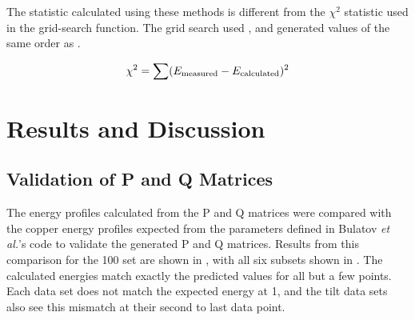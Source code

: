 \documentclass[twoside,senior]{BYUPhys}
\begin{document}
The statistic calculated using these methods is different from the $\chi^2$ statistic used in the grid-search function.  The grid search used , and generated values of the same order as .

\begin{equation}
\label{eq:chi2grid}
\chi^2=\sum (E_{\textnormal{measured}} - E_{\textnormal{calculated}})^2
\end{equation}

\chapter{Results and Discussion\label{results}}
\section{Validation of P and Q Matrices\label{results:PQValid}}
The energy profiles calculated from the P and Q matrices were compared with the copper energy profiles expected from the parameters defined in Bulatov \emph{et al.}'s code to validate the generated P and Q matrices.  Results from this comparison for the \textlangle{}100\textrangle{} set are shown in , with all six subsets shown in .  The calculated energies match exactly the predicted values for all but a few points.  Each data set does not match the expected energy at 1\textdegree{}, and the tilt data sets also see this mismatch at their second to last data point.
\end{document}
